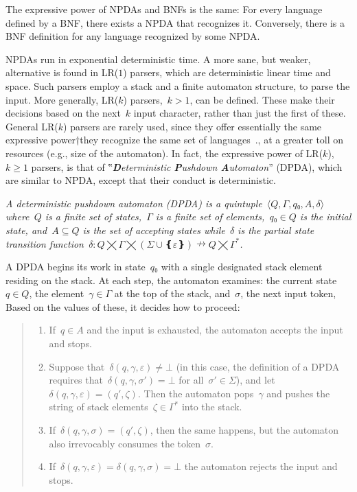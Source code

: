 \documentclass[a4paper,USenglish]{lipics-v2016}
\begin{document}
The expressive power of NPDAs and BNFs is the same:
  For every language defined by a BNF, there exists a NPDA that recognizes it.
Conversely, there is a BNF definition for any language recognized by some NPDA.

NPDAs run in exponential deterministic time.
 A more sane, but weaker, alternative is found in LR($1$) parsers,
  which are deterministic linear time and space.
Such parsers employ a stack and a finite automaton structure,
  to parse the input.
 More generally, LR($k$) parsers,~$k>1$, can be defined. These make their
 decisions based on the next~$k$ input character, rather than just the first of these.
 General LR($k$) parsers are rarely used, since they offer essentially
 the same expressive power†{they recognize the same set of languages~\cite{Knuth:65}.},
 at a greater toll on resources (e.g., size of the automaton).
In fact, the expressive power of LR($k$),~$k\ge1$ parsers, is that
 of ‟\emph{\textbf Deterministic \textbf Pushdown \textbf Automaton}” (DPDA),
  which are similar to NPDA, except that their conduct is deterministic.

\begin{Definition}
  \label{Definition:DPDA}
  \slshape
  A \textit{deterministic pushdown automaton} (DPDA) is a quintuple~$⟨Q,Γ,q₀,A,δ⟩$
  where~$Q$ is a finite set of \emph{states},~$Γ$ is a finite
  \emph{set of elements},~$q₀∈Q$ is the initial state,
  and~$A⊆Q$ is the \emph{set of accepting states} while~$δ$ is
  the \emph{partial state transition function}~$δ:Q⨉Γ⨉(Σ∪❴ε❵)↛Q⨉Γ^*$.
  \par
  A DPDA begins its work in state~$q₀$ with a single designated stack element residing on the stack.
  At each step, the automaton examines: the current state~$q∈Q$, 
  the element~$γ∈Γ$ at the top of the stack, and~$σ$, the next input token, 
  Based on the values of these, it decides how to proceed:
  \begin{quote}
  \begin{enumerate}
    \item If~$q∈A$ and the input is exhausted, the automaton accepts the input and stops.
    \item Suppose that~$δ(q,γ,ε)≠⊥$ (in this case, the definition of a DPDA
          requires that~$δ(q,γ,σ')=⊥$ for all~$σ'∈Σ$), and let~$δ(q,γ,ε)=(q',ζ)$.
          Then the automaton pops~$γ$ and pushes the string of stack
          elements~$ζ∈Γ^*$ into the stack.
    \item If~$δ(q,γ,σ)=(q',ζ)$, then the same happens, but the automaton also
          irrevocably consumes the token~$σ$.
    \item If~$δ(q,γ,ε)=δ(q,γ,σ)=⊥$ the automaton rejects the input and stops.
  \end{enumerate}
  \end{quote}
\end{Definition}
\end{document}
